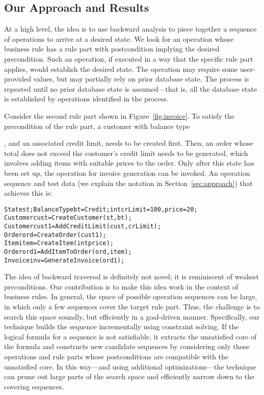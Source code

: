 \subsection{Our Approach and Results}

At a high level, the idea is to use backward analysis to piece together a
sequence of operations to arrive at a desired state. We look for an operation
whose business rule has a rule part with postcondition implying the desired
precondition.  Such an operation, if executed in a way that the specific rule
part applies, would establish the desired state.  The operation may require some
user-provided values, but may partially rely on prior database state. The
process is repeated until no prior database state is assumed---that is, all the
database state is established by operations identified in the process.

Consider the second rule part shown in Figure~\ref{fig:invoice}. To satisfy the
precondition of the rule part, a customer with balance type \subject{Credit},
and an associated credit limit, needs to be created first. Then, an order whose
total does not exceed the customer's credit limit needs to be generated, which
involves adding items with suitable prices to the order. Only after this state
has been set up, the operation for invoice generation can be invoked. An
operation sequence and test data (we explain the notation in
Section~\ref{sec:approach}) that achieves this is:

\vspace*{-4pt}%
{\scriptsize
\begin{alltt}
 State st; BalanceType bt = Credit; int crLimit = 100, price = 20;
 Customer cust = CreateCustomer(st, bt);
 Customer cust1 = AddCreditLimit(cust, crLimit);
 Order ord = CreateOrder(cust1);
 Item item = CreateItem(int price);
 Order ord1 = AddItemToOrder(ord, item);
 Invoice inv = GenerateInvoice(ord1);  
\end{alltt}}%
\vspace*{-5pt}

The idea of backward traversal is definitely not novel; it is reminiscent of
weakest preconditions.  Our contribution is to make this idea work in the
context of business rules.  In general, the space of possible operation
sequences can be large, in which only a few sequences cover the target rule
part. Thus, the challenge is to search this space soundly, but efficiently in a
goal-driven manner. Specifically, our technique builds the sequence
incrementally using constraint solving. If the logical formula for a sequence is
not satisfiable, it extracts the unsatisfied core of the formula and constructs
new candidate sequences by considering only those operations and rule parts
whose postconditions are compatible with the unsatisfied core. In this way---and
using additional optimizations---the technique can prune out large parts of the
search space and efficiently narrow down to the covering sequences.

